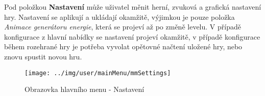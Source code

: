 Pod položkou \textbf{Nastavení} může uživatel měnit herní, zvuková a grafická nastavení hry. Nastavení se aplikují a ukládají okamžitě, výjimkou je pouze položka \textit{Animace generátoru energie}, která se projeví až po změně levelu. V případě konfigurace z hlavní nabídky se nastavení projeví okamžitě, v případě konfigurace během rozehrané hry je potřeba vyvolat opětovné načtení uložené hry, nebo znovu spustit novou hru.

\begin{figure}[!h]\centering
\texttt{[image: ../img/user/mainMenu/mmSettings]}

\caption{Obrazovka hlavního menu - Nastavení}
\label{fig:user_mainMenu_mmSettings}

\end{figure}

\FloatBarrier